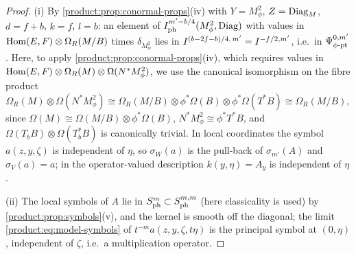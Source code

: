\begin{proof}
(i) By \cref{product:prop:conormal-props}(iv) with $Y=M^2_\phi$, $Z=\operatorname{Diag}_M$,
$d=f+b$, $k=f$, $l=b$: an element of $I^{m'-b/4}_{\mathrm{ph}}(M^2_\phi,\operatorname{Diag})$ with
values in $\operatorname{Hom}(E,F)\otimes\Omega_R(M/B)$ times $\delta_{M^2_\phi}$ lies in $I^{(b-2f-b)/4,\,m'}=I^{-f/2,m'}$, i.e.\ in
$\Psi^{0,m'}_{\phi\text{-}\mathrm{pt}}$. Here, to apply \cref{product:prop:conormal-props}(iv), which
requires values in $\operatorname{Hom}(E,F)\otimes\Omega_R(M)\otimes\Omega(N^*M^2_\phi)$, we use
the canonical isomorphism on the fibre product
\begin{equation*}
\Omega_R(M)\otimes\Omega(N^*M^2_\phi)\cong\Omega_R(M/B)\otimes\phi^*\Omega(B)
\otimes\phi^*\Omega(T^*B)\cong\Omega_R(M/B),
\end{equation*}
since $\Omega(M)\cong\Omega(M/B)\otimes\phi^*\Omega(B)$,
$N^*M^2_\phi\cong\phi^*T^*B$, and $\Omega(T_bB)\otimes\Omega(T^*_bB)$ is
canonically trivial. In local coordinates the symbol $a(z,y,\zeta)$ is independent of
$\eta$, so $\sigma_W(a)$ is the pull-back of $\sigma_{m'}(A)$ and $\sigma_V(a)=a$;
in the operator-valued description $k(y,\eta)=A_y$ is independent of $\eta$.

(ii) The local symbols of $A$ lie in $S^{m}_{\mathrm{ph}}\subset S^{m,m}_{\mathrm{ph}}$
(here classicality is used) by
\cref{product:prop:symbols}(v), and the kernel is smooth off the diagonal; the
limit \eqref{product:eq:model-symbols} of $t^{-m}a(z,y,\zeta,t\eta)$ is the
principal symbol at $(0,\eta)$, independent of $\zeta$, i.e.\ a multiplication
operator.


\end{proof}
